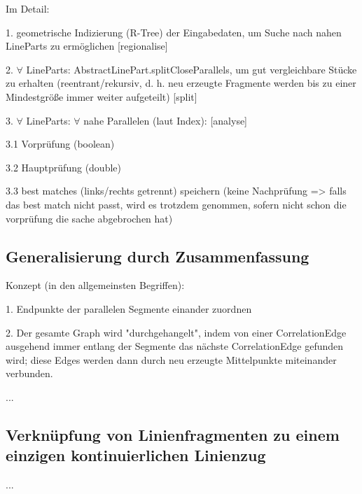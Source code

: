 \documentclass[../main/thesis.tex]{subfiles}
\begin{document}
Im Detail:

1. geometrische Indizierung (R-Tree) der Eingabedaten, um Suche nach nahen LineParts zu ermöglichen [regionalise]

2. $\forall$ LineParts: AbstractLinePart.splitCloseParallels, um gut vergleichbare Stücke zu erhalten (reentrant/rekursiv, d. h. neu erzeugte Fragmente werden bis zu einer Mindestgröße immer weiter aufgeteilt) [split]

3. $\forall$ LineParts: $\forall$ nahe Parallelen (laut Index): [analyse]

3.1 Vorprüfung (boolean)

3.2 Hauptprüfung (double)

3.3 best matches (links/rechts getrennt) speichern (keine Nachprüfung => falls das best match nicht passt, wird es trotzdem genommen, sofern nicht schon die vorprüfung die sache abgebrochen hat)



\subsection{Generalisierung durch Zusammenfassung}

Konzept (in den allgemeinsten Begriffen):

1. Endpunkte der parallelen Segmente einander zuordnen

2. Der gesamte Graph wird "durchgehangelt", indem von einer CorrelationEdge ausgehend immer entlang der Segmente das nächste CorrelationEdge gefunden wird; diese Edges werden dann durch neu erzeugte Mittelpunkte miteinander verbunden.





...


\subsection{Verknüpfung von Linienfragmenten zu einem einzigen kontinuierlichen Linienzug}

...


\end{document}
